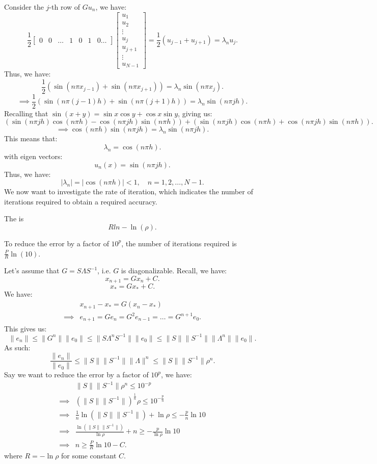 \documentclass[../main/main.tex]{subfiles}
\begin{document}
Consider the $j$-th row of $G u_n$, we have:  \[
    \frac{1}{2}\begin{bmatrix} 0 & 0 & \ldots & 1 & 0 & 1 & 0 \ldots  \end{bmatrix} \begin{bmatrix} u_1 \\ u_2 \\ \vdots \\ u_j \\ u_{j+1} \\ \vdots \\u_{N-1} \end{bmatrix}   = \frac{1}{2}(u_{j-1} + u_{j+1}) = \lambda_n u_j
.\] Thus, we have: \[
\frac{1}{2}(\sin (n\pi x_{j-1}) + \sin(n\pi x_{j+1} )) = \lambda_n \sin(n\pi x_j)
.\] \[
\implies \frac{1}{2}(\sin (n\pi (j-1)h) + \sin(n\pi (j+1)h )) = \lambda_n \sin(n\pi jh)
.\] Recalling that $\sin(x+y) = \sin x \cos y + \cos x \sin y$, giving us: \[
(\sin(n\pi jh) \cos(n\pi h) - \cos(n\pi j h) \sin(n\pi h) )
+ (\sin(n\pi jh) \cos(n\pi h) + \cos(n\pi j h) \sin(n\pi h) )
.\] \[
\implies \cos(n\pi h)\sin (n\pi jh) = \lambda_n \sin(n \pi j h)
.\] This means that: \[
\lambda_n = \cos(n\pi h)
.\] with eigen vectors: \[
u_n(x) = \sin(n\pi jh)
.\] Thus, we have: \[
|\lambda_n| = |\cos(n \pi h)| < 1, \quad n = 1,2,\ldots,N-1
.\] 
We now want to investigate the rate of iteration, which indicates the number of iterations required to obtain a required accuracy.

\begin{definition}
The  is \[
        R ln-\ln(\rho)
    .\] 
\end{definition}
\begin{example}
    To reduce the error by a factor of $10^p$, the number of iterations required is $\frac{P}{R} \ln(10)$.
\end{example}
Let's assume that $G = S\Lambda S^{-1}$, i.e. $G$ is diagonalizable. Recall, we have:  \[
x_{n+1} = Gx_n + C
.\] \[
x_* = G x_* + C
.\] We have: 
\begin{align*} 
&x_{n+1} - x_* = G(x_n - x_{*}) \\
\implies& e_{n+1} = G e_n = G^2 e_{n-1} = \ldots = G^{n+1} e_0  
.\end{align*} This gives us: \[
\|e_n\| \le  \| G^n\| \| e_0\| \le  \| S \Lambda^n S^{-1}\| \|e_0\| \le  \| S\| \|S^{-1}\| \|\Lambda^n\| \| e_0\|
.\] 
As such: \[
\frac{\|e_n\|}{\|e_0\|} \le  \| S\| \|S^{-1}\| \|\Lambda\|^n \le  \| S\| \|S^{-1}\| \rho^n
.\] Say we want to reduce the error by a factor of $10^p$, we have: 
\begin{align*}
&\| S\| \| S^{-1}\| \rho^n \le  10^{-p} \\
    \implies& (\| S\| \| S^{-1}\|)^{\frac{1}{n}} \rho \le  10^{-\frac{p}{n}} \\
            \implies& \frac{1}{n} \ln(\| S\| \| S^{-1}\|) + \ln \rho \le  - \frac{p}{n} \ln 10  \\
            \implies & \frac{\ln(\| S\| \| S^{-1}\|)}{\ln \rho} +  n \ge   - \frac{p}{\ln \rho} \ln 10 \\
            \implies& n \ge  \frac{P}{R}\ln 10 - C
.\end{align*} where $R = -\ln \rho$ for some constant $C$.
\end{document}
